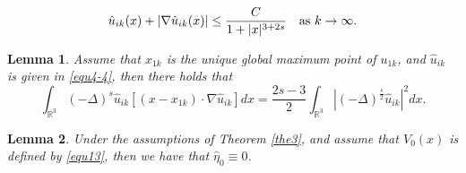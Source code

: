 \documentclass[10pt,a4paper]{amsart}
\newtheorem{lemma}{Lemma}
\begin{document}
		\begin{equation}\label{equ5-1}
			\hat{u}_{ik}(x)+	|\nabla\hat{u}_{ik}(x)|\leq\frac{C}{1+|x|^{3+2s}}\quad \hbox{as $k\rightarrow\infty$}.
		\end{equation}

	\begin{lemma}\label{lem5-4}
		Assume that $x_{1k}$ is the unique global maximum point of $u_{1k}$, and $\hat{u}_{ik}$ is given in \eqref{equ4-4}, then there holds that
		\begin{equation*}
			\int_{\mathbb{R}^{3}}(-\Delta)^{s}\hat{u}_{ik}[(x-x_{1k})\cdot\nabla\hat{u}_{ik}]dx=\frac{2s-3}{2} \int_{\mathbb{R}^3} \left| (-\Delta)^{\frac{s}{2}}\hat{u}_{ik}\right| ^2dx.
		\end{equation*}
	\end{lemma}

	\begin{lemma}\label{lem4-4}
		Under the assumptions of Theorem \ref{the3}, and assume that $V_{0}(x)$ is defined by \eqref{equ13}, then we have that $\hat{\eta}_{0}\equiv0$.
	\end{lemma}
\end{document}
